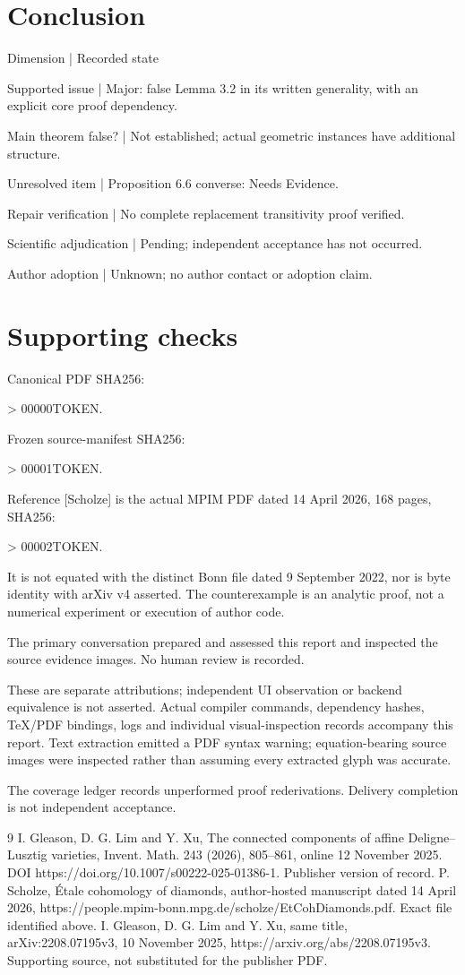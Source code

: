 \documentclass[10pt]{article}
\begin{document}
\section*{Conclusion}
Dimension | Recorded state\par
Supported issue | Major: false Lemma 3.2 in its written generality, with an explicit core proof dependency.\par
Main theorem false? | Not established; actual geometric instances have additional structure.\par
Unresolved item | Proposition 6.6 converse: Needs Evidence.\par
Repair verification | No complete replacement transitivity proof verified.\par
Scientific adjudication | Pending; independent acceptance has not occurred.\par
Author adoption | Unknown; no author contact or adoption claim.\par
\section*{Supporting checks}
Canonical PDF SHA256:\par
> 00000TOKEN.\par
Frozen source-manifest SHA256:\par
> 00001TOKEN.\par
Reference [Scholze] is the actual MPIM PDF dated 14 April 2026, 168 pages, SHA256:\par
> 00002TOKEN.\par
It is not equated with the distinct Bonn file dated 9 September 2022, nor is byte identity with arXiv v4 asserted. The counterexample is an analytic proof, not a numerical experiment or execution of author code.\par
The primary conversation prepared and assessed this report and inspected the source evidence images. No human review is recorded.\par
These are separate attributions; independent UI observation or backend equivalence is not asserted. Actual compiler commands, dependency hashes, TeX/PDF bindings, logs and individual visual-inspection records accompany this report. Text extraction emitted a PDF syntax warning; equation-bearing source images were inspected rather than assuming every extracted glyph was accurate.\par
The coverage ledger records unperformed proof rederivations. Delivery completion is not independent acceptance.\par
9 I. Gleason, D. G. Lim and Y. Xu, The connected components of affine Deligne–Lusztig varieties, Invent. Math. 243 (2026), 805–861, online 12 November 2025. DOI https://doi.org/10.1007/s00222-025-01386-1. Publisher version of record. P. Scholze, Étale cohomology of diamonds, author-hosted manuscript dated 14 April 2026, https://people.mpim-bonn.mpg.de/scholze/EtCohDiamonds.pdf. Exact file identified above. I. Gleason, D. G. Lim and Y. Xu, same title, arXiv:2208.07195v3, 10 November 2025, https://arxiv.org/abs/2208.07195v3. Supporting source, not substituted for the publisher PDF.\par
\end{document}

